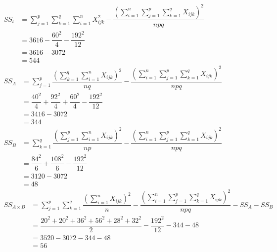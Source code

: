 \documentclass[UTF8]{ctexart}
\begin{document}
%
%
%
$
\begin{aligned}
SS_t
&=\displaystyle \sum_{j=1}^{p}\displaystyle \sum_{k=1}^{q}\sum_{i=1}^{n}X_{ijk}^2
-\dfrac{\left(\displaystyle\sum_{i=1}^{n} \sum_{j=1}^{p}\sum_{k=1}^{q}X_{ijk}\right)^2}{npq}\\
&=3616-\dfrac{60^2}{4}-\dfrac{192^2}{12}\\
&=3616-3072\\
&=544
\end{aligned}
$
~\\

$
\begin{aligned}
SS_A
&=\displaystyle \sum_{j=1}^{p} \dfrac{\left(\displaystyle \sum_{k=1}^{q}\sum_{i=1}^{n}X_{ijk}\right)^2}{nq}
-\dfrac{\left(\displaystyle\sum_{i=1}^{n} \sum_{j=1}^{p}\sum_{k=1}^{q}X_{ijk}\right)^2}{npq}\\
&=\dfrac{40^2}{4}+\dfrac{92^2}{4}+\dfrac{60^2}{4}-\dfrac{192^2}{12}\\
&=3416-3072\\
&=344
\end{aligned}
$
~\\

$
\begin{aligned}
SS_B
&=\displaystyle \sum_{k=1}^{q} \dfrac{\left(\displaystyle \sum_{j=1}^{p}\sum_{i=1}^{n}X_{ijk}\right)^2}{np}
-\dfrac{\left(\displaystyle\sum_{i=1}^{n} \sum_{j=1}^{p}\sum_{k=1}^{q}X_{ijk}\right)^2}{npq}\\
&=\dfrac{84^2}{6}+\dfrac{108^2}{6}-\dfrac{192^2}{12}\\
&=3120-3072\\
&=48
\end{aligned}
$
~\\

$
\begin{aligned}
SS_{A\times B}
&=\displaystyle \sum_{j=1}^{p}\sum_{k=1}^{q}\dfrac{\left(\displaystyle\sum_{i=1}^{n}X_{ijk}\right)^2}{n}
-\dfrac{\left(\displaystyle\sum_{i=1}^{n} \sum_{j=1}^{p}\sum_{k=1}^{q}X_{ijk}\right)^2}{npq}
-SS_A-SS_B\\
&=\dfrac{20^2+20^2+36^2+56^2+28^2+32^2}{2}-\dfrac{192^2}{12}-344-48\\
&=3520-3072-344-48\\
&=56
\end{aligned}
$
~\\
\end{document}
